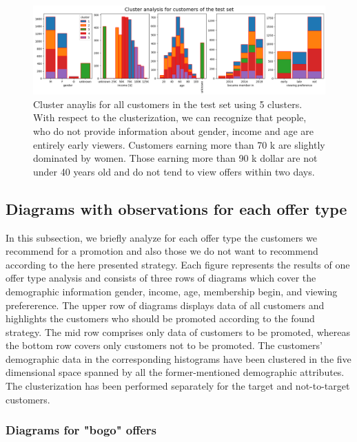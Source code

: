 \documentclass[11pt]{article} %
\begin{document}
\begin{figure}[H]
\includegraphics[width=1\textwidth]{results/results_test_set.png}
\caption{Cluster anaylis for all customers in the test set using 5 clusters. With respect to the clusterization, we can recognize that people, who do not provide information about gender, income and age are entirely early viewers. 
Customers earning more than 70 k are slightly dominated by women. Those earning more than 90 k dollar are not under 40 years old and do not tend to view offers within two days.}
\end{figure}

\subsection{Diagrams with observations for each offer type}
In this subsection, we briefly analyze for each offer type the customers we recommend for a promotion and also those we do not want to recommend according to the here presented strategy.
Each figure represents the results of one offer type analysis and consists of three rows of diagrams which cover the demographic information gender, income, age, membership begin, and viewing prefererence.
The upper row of diagrams displays data of all customers and highlights the customers who should be promoted according to the found strategy.
The mid row comprises only data of customers to be promoted, whereas the bottom row covers only customers not to be promoted.
The customers' demographic data in the corresponding histograms have been clustered in the five dimensional space spanned by all the former-mentioned demographic attributes. The clusterization has been performed separately for the  target and not-to-target customers.
\subsubsection{Diagrams for "bogo" offers}
\end{document}
